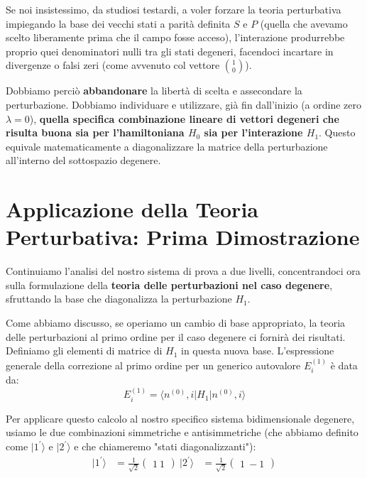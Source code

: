 Se noi insistessimo, da studiosi testardi, a voler forzare la teoria perturbativa impiegando la base dei vecchi stati a parità definita $S$ e $P$ (quella che avevamo scelto liberamente prima che il campo fosse acceso), l'interazione produrrebbe proprio quei denominatori nulli tra gli stati degeneri, facendoci incartare in divergenze o falsi zeri (come avvenuto col vettore $\binom{1}{0}$).

Dobbiamo perciò \textbf{abbandonare} la libertà di scelta e assecondare la perturbazione. Dobbiamo individuare e utilizzare, già fin dall'inizio (a ordine zero $\lambda=0$), \textbf{quella specifica combinazione lineare di vettori degeneri che risulta buona sia per l'hamiltoniana $H_0$ sia per l'interazione $H_1$}. Questo equivale matematicamente a diagonalizzare la matrice della perturbazione all'interno del sottospazio degenere.

\section{Applicazione della Teoria Perturbativa: Prima Dimostrazione}

Continuiamo l'analisi del nostro sistema di prova a due livelli, concentrandoci ora sulla formulazione della \textbf{teoria delle perturbazioni nel caso degenere}, sfruttando la base che diagonalizza la perturbazione $H_1$.

Come abbiamo discusso, se operiamo un cambio di base appropriato, la teoria delle perturbazioni al primo ordine per il caso degenere ci fornirà dei risultati. Definiamo gli elementi di matrice di $H_1$ in questa nuova base. L'espressione generale della correzione al primo ordine per un generico autovalore $E_i^{(1)}$ è data da:
\begin{equation}
E_i^{(1)} = \langle n^{(0)}, i | H_1 | n^{(0)}, i \rangle
\end{equation}

Per applicare questo calcolo al nostro specifico sistema bidimensionale degenere, usiamo le due combinazioni simmetriche e antisimmetriche (che abbiamo definito come $\vert{}1^{\prime}\rangle$ e $\vert{}2^{\prime}\rangle$ e che chiameremo "stati diagonalizzanti"):
\begin{align}
|1^{\prime}\rangle &= \frac{1}{\sqrt{2}} \begin{pmatrix} 1 \ 1 \end{pmatrix} \
|2^{\prime}\rangle &= \frac{1}{\sqrt{2}} \begin{pmatrix} 1 \ -1 \end{pmatrix}
\end{align}

